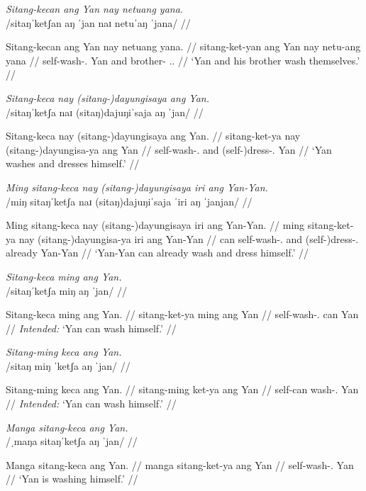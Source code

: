 \documentclass[12pt,a4paper]{scrartcl}
\newcommand{\TsgM}{{\Tsg}.{\M}}
\newcommand{\TplM}{{\Tpl}.{\M}}
\begin{document}
\ex\begingl
\glpreamble \textit{Sitang-kecan ang Yan nay netuang yana.}\\
	/sitaŋˈketʃan aŋ ˈjan naɪ netuˈaŋ ˈjana/ //

\gla Sitang-kecan ang Yan nay netuang yana. //
\glb sitang-ket-yan ang Yan nay netu-ang yana //
\glc self-wash-\TplM{} \Aarg{} Yan and brother-\Aarg{} \TsgM{}.\Gen{} //
\glft `Yan and his brother wash themselves.' //
\endgl\xe

\ex\begingl
\glpreamble \textit{Sitang-keca nay (sitang-)dayungisaya ang Yan.}\\
	/sitaŋˈketʃa naɪ (sitaŋ)dajuŋiˈsaja aŋ ˈjan/ //

\gla Sitang-keca nay (sitang-)dayungisaya ang Yan. //
\glb sitang-ket-ya nay (sitang-)dayungisa-ya ang Yan //
\glc self-wash-\TsgM{} and (self-)dress-\TsgM{} \Aarg{} Yan //
\glft `Yan washes and dresses himself.' //
\endgl\xe

\ex\begingl
\glpreamble \textit{Ming sitang-keca nay (sitang-)dayungisaya iri ang Yan-Yan.}\\
	/miŋ sitaŋˈketʃa naɪ (sitaŋ)dajuŋiˈsaja ˈiri aŋ ˈjanjan/ //

\gla Ming sitang-keca nay (sitang-)dayungisaya iri ang Yan-Yan. //
\glb ming sitang-ket-ya nay (sitang-)dayungisa-ya iri ang Yan-Yan //
\glc can self-wash-\TsgM{} and (self-)dress-\TsgM{} already \Aarg{} Yan-Yan //
\glft `Yan-Yan can already wash and dress himself.' //
\endgl\xe
\xe

\pex
\a\ljudge*\begingl
\glpreamble \textit{Sitang-keca ming ang Yan.}\\
	/sitaŋˈketʃa miŋ aŋ ˈjan/ //

\gla Sitang-keca ming ang Yan. //
\glb sitang-ket-ya ming ang Yan //
\glc self-wash-\TsgM{} can \Aarg{} Yan //
\glft \textit{Intended:} `Yan can wash himself.' //
\endgl

\a\ljudge*\begingl
\glpreamble \textit{Sitang-ming keca ang Yan.}\\
	/sitaŋ miŋ ˈketʃa aŋ ˈjan/ //

\gla Sitang-ming keca ang Yan. //
\glb sitang-ming ket-ya ang Yan //
\glc self-can wash-\TsgM{} \Aarg{} Yan //
\glft \textit{Intended:} `Yan can wash himself.' //
\endgl

\xe

\pex
\a\begingl
\glpreamble \textit{Manga sitang-keca ang Yan.}\\
	/ˌmaŋa sitaŋˈketʃa aŋ ˈjan/ //

\gla Manga sitang-keca ang Yan. //
\glb manga sitang-ket-ya ang Yan //
\glc \Prog{} self-wash-\TsgM{} \Aarg{} Yan //
\glft `Yan is washing himself.' //
\endgl
\end{document}

